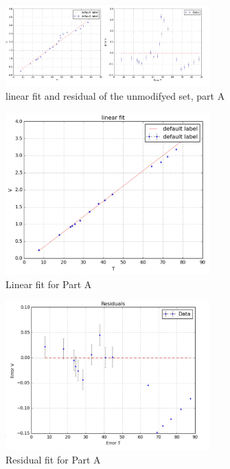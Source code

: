 \documentclass[12pt,a4paper]{report}
\begin{document}
\begin{figure}[H]
    \centering
    \includegraphics[width=0.7\textwidth]{Part A results/full set linear fit.png}
    \caption{linear fit  and residual of the unmodifyed set, part A}
    \label{fig:appendix_partA_full_set_fit}
\end{figure}


\begin{figure}[H]
    \centering
    \includegraphics[width=0.7\textwidth]{Part A results/linear fit.png}
    \caption{Linear fit for Part A}
    \label{fig:appendix_partA_linear_fit}
\end{figure}

\begin{figure}[H]
    \centering
    \includegraphics[width=0.7\textwidth]{Part A results/res.png}
    \caption{Residual fit for Part A}
    \label{fig:appendix_partA_residual_fit}
\end{figure}
\end{document}
